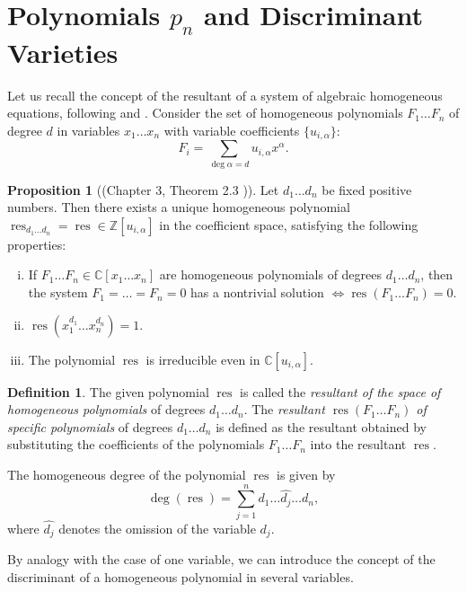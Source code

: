 \documentclass[14pt, dvipsnames]{extarticle}
\theoremstyle{definition}
\newtheorem{prop}{Proposition}
\theoremstyle{definition}
\newtheorem{defi}{Definition}
\theoremstyle{remark}
\DeclareMathOperator{\res}{\mathrm{res}}
\begin{document}
\section{Polynomials $p_n$ and Discriminant Varieties}\label{p_n_and_disc_varieties}

Let us recall the concept of the resultant of a system of algebraic homogeneous equations, following \cite[Chapter 13]{Gelfand} and \cite[Chapter 3]{Cox}. Consider the set of homogeneous polynomials $F_1\dots F_n$ of degree $d$ in variables $x_1\dots x_n$ with variable coefficients $\{u_{i, \alpha}\}$:
$$F_i = \sum\limits_{\deg \alpha = d} u_{i, \alpha}x^{\alpha}.$$

\begin{prop}[(Chapter 3, Theorem 2.3 \cite{Cox})]
Let $d_1\dots d_n$ be fixed positive numbers. Then there exists a unique homogeneous polynomial $\res_{d_1\dots d_n} = \res \in \mathbb{Z}[u_{i, \alpha}]$ in the coefficient space, satisfying the following properties:

\begin{enumerate}[(i)]
\item If $F_1\dots F_n \in \mathbb{C}[x_1\dots x_n]$ are homogeneous polynomials of degrees $d_1\dots d_n$, then the system $F_1 = … = F_n = 0$ has a nontrivial solution $\Leftrightarrow \res(F_1\dots F_n) = 0$.
\item $\res(x_1^{d_1}\dots x_n^{d_n}) = 1$.
\item The polynomial $\res$ is irreducible even in $\mathbb{C}[u_{i, \alpha}]$.
\end{enumerate}
\end{prop}

\begin{defi}
The given polynomial $\res$ is called the {\it resultant of the space of homogeneous polynomials} of degrees $d_1\dots d_n$. The {\it resultant $\res(F_1\dots F_n)$ of specific polynomials} of degrees $d_1\dots d_n$ is defined as the resultant obtained by substituting the coefficients of the polynomials $F_1\dots F_n$ into the resultant $\res$.
\end{defi}

The homogeneous degree of the polynomial $\res$ is given by
\begin{equation}\label{res}
\deg(\res) = \sum\limits_{j=1}^n d_1 \dots \hat{d_j} \dots d_n,
\end{equation}
where $\hat{d_j}$ denotes the omission of the variable $d_j$.

By analogy with the case of one variable, we can introduce the concept of the discriminant of a homogeneous polynomial in several variables.
\end{document}
